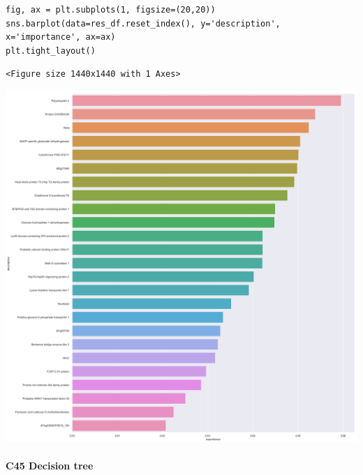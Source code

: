 \documentclass[11pt]{article}
\begin{document}
\begin{verbatim}
fig, ax = plt.subplots(1, figsize=(20,20))
sns.barplot(data=res_df.reset_index(), y='description', x='importance', ax=ax)
plt.tight_layout()
\end{verbatim}

\begin{verbatim}
<Figure size 1440x1440 with 1 Axes>
\end{verbatim}


\begin{center}
\includegraphics[width=.9\linewidth]{obipy-resources/93e2fbf76ed477962282ae99767b8408de4d3ed9/65666fbca873a47968edcf553fd409812446c3ba.png}
\end{center}




\paragraph{C45 Decision tree}
\label{sec:orgc386f35}
\end{document}
